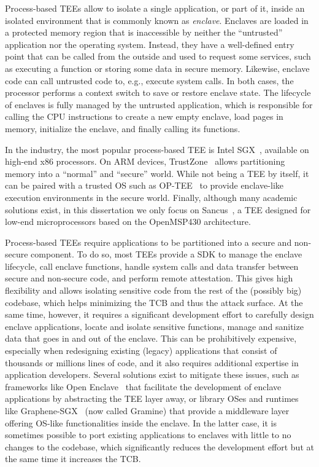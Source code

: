 Process-based \acp{TEE} allow to isolate a single application, or part of it,
inside an isolated environment that is commonly known as \emph{enclave}.
Enclaves are loaded in a protected memory region that is inaccessible by neither
the ``untrusted'' application nor the operating system. Instead, they have a
well-defined entry point that can be called from the outside and used to request
some services, such as executing a function or storing some data in secure
memory. Likewise, enclave code can call untrusted code to, e.g., execute system
calls. In both cases, the processor performs a context switch to save or restore
enclave state. The lifecycle of enclaves is fully managed by the untrusted
application, which is responsible for calling the CPU instructions to create a
new empty enclave, load pages in memory, initialize the enclave, and finally
calling its functions.

In the industry, the most popular process-based \ac{TEE} is Intel
\ac{SGX}~\cite{sgx}, available on high-end x86 processors. On ARM devices,
TrustZone~\cite{alves:trustzone} allows partitioning memory into a ``normal''
and ``secure'' world. While not being a \ac{TEE} by itself, it can be paired
with a trusted OS such as OP-TEE~\cite{OPTEE} to provide enclave-like execution
environments in the secure world. Finally, although many academic solutions
exist, in this dissertation we only focus on Sancus~\cite{sancus}, a \ac{TEE}
designed for low-end microprocessors based on the OpenMSP430 architecture.

Process-based \acp{TEE} require applications to be partitioned into a secure and
non-secure component. To do so, most \acp{TEE} provide a \ac{SDK} to manage the
enclave lifecycle, call enclave functions, handle system calls and data transfer
between secure and non-secure code, and perform remote attestation. This gives
high flexibility and allows isolating sensitive code from the rest of the
(possibly big) codebase, which helps minimizing the \ac{TCB} and thus the attack
surface. At the same time, however, it requires a significant development effort
to carefully design enclave applications, locate and isolate sensitive
functions, manage and sanitize data that goes in and out of the enclave. This
can be prohibitively expensive, especially when redesigning existing (legacy)
applications that consist of thousands or millions lines of code, and it also
requires additional expertise in application developers. Several solutions exist
to mitigate these issues, such as frameworks like Open
Enclave~\cite{openenclave} that facilitate the development of enclave
applications by abstracting the \ac{TEE} layer away, or library OSes and
runtimes like Graphene-SGX~\cite{grapheneSgx} (now called Gramine) that provide
a middleware layer offering OS-like functionalities inside the enclave. In the
latter case, it is sometimes possible to port existing applications to enclaves
with little to no changes to the codebase, which significantly reduces the
development effort but at the same time it increases the \ac{TCB}.

